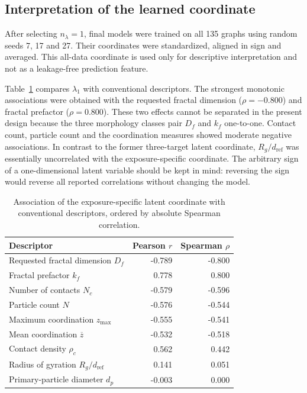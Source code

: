 \documentclass[12pt,a4paper]{article}
\begin{document}
\subsection{Interpretation of the learned coordinate}

After selecting $n_\lambda=1$, final models were trained on all 135 graphs
using random seeds 7, 17 and 27. Their coordinates were standardized, aligned
in sign and averaged. This all-data coordinate is used only for descriptive
interpretation and not as a leakage-free prediction feature.

Table~\ref{tab:latent_correlations} compares $\lambda_1$ with conventional
descriptors. The strongest monotonic associations were obtained with the
requested fractal dimension ($\rho=-0.800$) and fractal prefactor
($\rho=0.800$). These two effects cannot be separated in the present design
because the three morphology classes pair $D_f$ and $k_f$ one-to-one. Contact
count, particle count and the coordination measures showed moderate negative
associations. In contrast to the former three-target latent coordinate,
$R_g/d_{\mathrm{ref}}$ was essentially uncorrelated with the exposure-specific
coordinate. The arbitrary sign of a one-dimensional latent variable should be
kept in mind: reversing the sign would reverse all reported correlations
without changing the model.

\begin{table}[!tbp]
	\centering
	\caption{Association of the exposure-specific latent coordinate with
		conventional descriptors, ordered by absolute Spearman correlation.}
	\label{tab:latent_correlations}
	\begin{tabular}{lrr}
		\toprule
		Descriptor & Pearson $r$ & Spearman $\rho$ \\
		\midrule
		Requested fractal dimension $D_f$         & -0.789 & -0.800 \\
		Fractal prefactor $k_f$                    &  0.778 &  0.800 \\
		Number of contacts $N_c$                   & -0.579 & -0.596 \\
		Particle count $N$                         & -0.576 & -0.544 \\
		Maximum coordination $z_{\max}$            & -0.555 & -0.541 \\
		Mean coordination $\overline z$            & -0.532 & -0.518 \\
		Contact density $\rho_c$                   &  0.562 &  0.442 \\
		Radius of gyration $R_g/d_{\mathrm{ref}}$  &  0.141 &  0.051 \\
		Primary-particle diameter $d_p$            & -0.003 &  0.000 \\
		\bottomrule
	\end{tabular}
\end{table}
\end{document}
